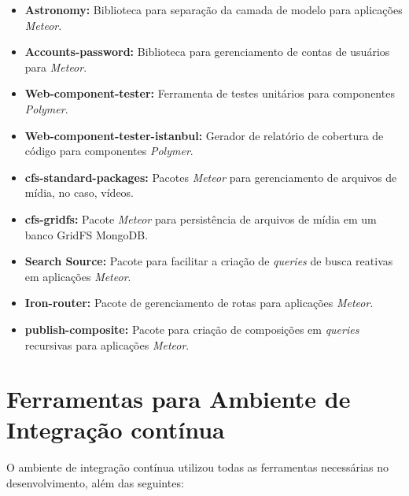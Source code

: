 \begin{apendicesenv}
\begin{itemize}
	\item \textbf{Astronomy:} Biblioteca para separação da camada de modelo para aplicações \textit{Meteor}.
	\item \textbf{Accounts-password:} Biblioteca para gerenciamento de contas de usuários para \textit{Meteor}.
	\item \textbf{Web-component-tester:} Ferramenta de testes unitários para componentes \textit{Polymer}.
	\item \textbf{Web-component-tester-istanbul:} Gerador de relatório de cobertura de código para componentes \textit{Polymer}.
	\item \textbf{cfs-standard-packages:} Pacotes \textit{Meteor} para gerenciamento de arquivos de mídia, no caso, vídeos.
	\item \textbf{cfs-gridfs:} Pacote \textit{Meteor} para persistência de arquivos de mídia em um banco GridFS MongoDB.
	\item \textbf{Search Source:} Pacote para facilitar a criação de \textit{queries} de busca reativas em aplicações \textit{Meteor}.
	\item \textbf{Iron-router:} Pacote de gerenciamento de rotas para aplicações \textit{Meteor}. 
	\item \textbf{publish-composite:} Pacote para criação de composições em \textit{queries} recursivas para aplicações \textit{Meteor}. 
\end{itemize}

\section{Ferramentas para Ambiente de Integração contínua}

O ambiente de integração contínua utilizou todas as ferramentas necessárias no desenvolvimento, além das seguintes:


\end{apendicesenv}
